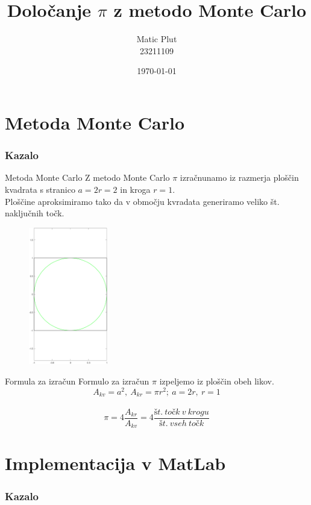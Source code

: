 \documentclass{beamer}
\title{Določanje $\pi$ z metodo Monte Carlo}
\author[Matic Plut]{Matic Plut \\ 23211109}
\date{\today}
\begin{document}
\begin{frame}
    \titlepage
\end{frame}
\logo{}

\section{Metoda Monte Carlo}

\begin{frame}
    \frametitle{Kazalo}
    \tableofcontents[currentsection]
\end{frame}

\begin{frame}{Metoda Monte Carlo}
    Z metodo Monte Carlo $\pi$ izračnunamo iz razmerja ploščin kvadrata s stranico $a = 2r = 2$ in kroga $r = 1$.
    \\
    Ploščine aproksimiramo tako da v območju kvradata generiramo veliko št. naključnih točk.

    \begin{figure}
      \centering
      \includegraphics[height=6cm]{graf.png}
    \end{figure}
\end{frame}

\begin{frame}{Formula za izračun}
    Formulo za izračun $\pi$ izpeljemo iz ploščin obeh likov.\\
    $$A_{kv}=a^2,~A_{kr}=\pi r^2;~a=2r,~r=1$$\\
    $$\pi = 4\frac{A_{kr}}{A_{kv}}=4\frac{št.~točk~v~krogu}{št.~vseh~točk}$$
\end{frame}

\section{Implementacija v MatLab}

\begin{frame}
    \frametitle{Kazalo}
    \tableofcontents[currentsection]
\end{frame}
\end{document}
